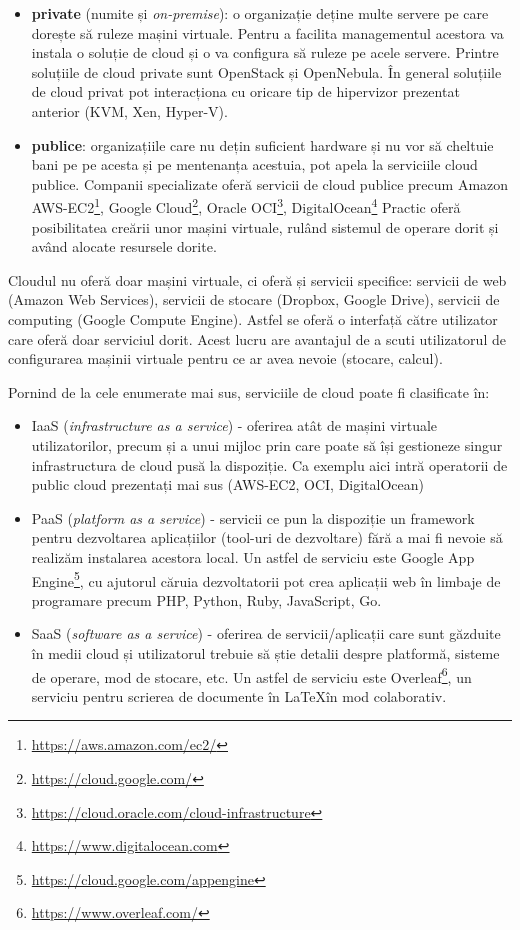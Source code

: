\begin{itemize}
  \item \textbf{private} (numite și \textit{on-premise}): o organizație deține multe servere pe care dorește să
		ruleze mașini virtuale. Pentru a facilita managementul acestora
		va instala o soluție de cloud și o va configura să ruleze pe
		acele servere. Printre soluțiile de cloud private sunt OpenStack și OpenNebula. În
		general soluțiile de cloud privat pot interacționa cu oricare
		tip de hipervizor prezentat anterior (KVM, Xen, Hyper-V).
              \item \textbf{publice}: organizațiile care nu dețin suficient hardware și nu vor
		să cheltuie bani pe pe acesta și pe mentenanța acestuia,
		pot apela la serviciile cloud publice. Companii specializate
                oferă servicii de cloud publice precum Amazon AWS-EC2\footnote{\url{https://aws.amazon.com/ec2/}}, Google
                Cloud\footnote{\url{https://cloud.google.com/}}, Oracle OCI\footnote{\url{https://cloud.oracle.com/cloud-infrastructure}}, DigitalOcean\footnote{\url{https://www.digitalocean.com}}
		Practic oferă posibilitatea creării unor mașini virtuale, rulând
		sistemul de operare dorit și având alocate resursele dorite.
\end{itemize}

Cloudul nu oferă doar mașini virtuale, ci oferă și servicii specifice: servicii
de web (Amazon Web Services), servicii de stocare (Dropbox, Google Drive),
servicii de computing (Google Compute Engine). Astfel se oferă o interfață
către utilizator care oferă doar serviciul dorit. Acest lucru are avantajul de a
scuti utilizatorul de configurarea mașinii virtuale pentru ce ar avea
nevoie (stocare, calcul).

Pornind de la cele enumerate mai sus, serviciile de cloud poate fi clasificate în:

\begin{itemize}
  \item IaaS (\textit{infrastructure as a service}) - oferirea atât de mașini
		virtuale utilizatorilor, precum și a unui mijloc prin care poate
		să își gestioneze singur infrastructura de cloud pusă la
		dispoziție. Ca exemplu aici intră operatorii de public cloud
		prezentați mai sus (AWS-EC2, OCI, DigitalOcean)
  \item PaaS (\textit{platform as a service}) - servicii ce pun la dispoziție un
		framework pentru dezvoltarea aplicațiilor (tool-uri de
		dezvoltare) fără a mai fi nevoie să realizăm instalarea acestora
                local. Un astfel de serviciu este Google App Engine\footnote{\url{https://cloud.google.com/appengine}}, cu ajutorul căruia dezvoltatorii pot crea aplicații web în limbaje de programare precum PHP, Python, Ruby, JavaScript, Go.
  \item SaaS (\textit{software as a service}) - oferirea de servicii/aplicații care
		sunt găzduite în medii cloud și utilizatorul trebuie să știe
		detalii despre platformă, sisteme de operare, mod de stocare,
                etc. Un astfel de serviciu este Overleaf\footnote{\url{https://www.overleaf.com/}}, un serviciu pentru scrierea de documente în \LaTeX în mod colaborativ.
\end{itemize}

